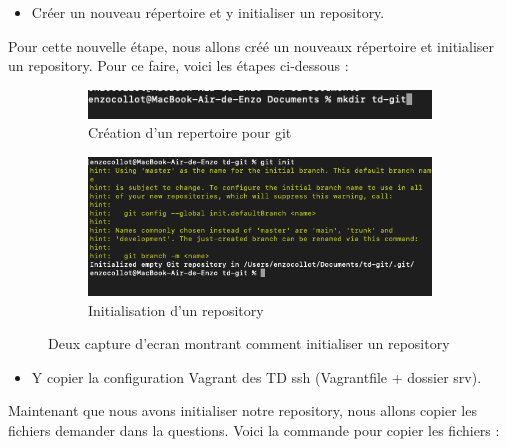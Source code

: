 \documentclass[12pt]{article}
\begin{document}
\vspace{0.3cm}

\begin{itemize}
  \item Créer un nouveau répertoire et y initialiser un repository.
\end{itemize}

Pour cette nouvelle étape, nous allons créé un nouveaux répertoire et initialiser un repository. Pour ce faire, voici les étapes ci-dessous : 

\vspace{0.3cm}

\begin{figure}[h]
  \centering
  \begin{subfigure}{0.30\textwidth}
    \centering
    \includegraphics[width=\textwidth]{Image-TD-Git-1/new-directory.png}
    \caption{Création d'un repertoire pour git}
  \end{subfigure}
  \vspace{0.9cm} %
  \begin{subfigure}{0.45\textwidth}
    \centering
    \includegraphics[width=\textwidth]{Image-TD-Git-1/git-init.png}
    \caption{Initialisation d'un repository}
  \end{subfigure}
  \caption{Deux capture d'ecran montrant comment initialiser un repository}
\end{figure}

\vspace{0.3cm}

\begin{itemize}
  \item Y copier la configuration Vagrant des TD ssh (Vagrantfile + dossier srv).
\end{itemize}

Maintenant que nous avons initialiser notre repository, nous allons copier les fichiers demander dans la questions. Voici la commande pour copier les fichiers : 
\end{document}
